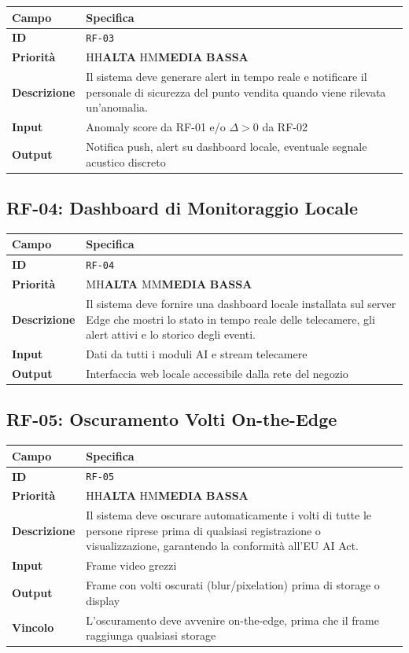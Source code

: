 \documentclass[a4paper, 12pt]{article}
\newcommand{\reqid}[1]{\texttt{\textcolor{visaiblue}{#1}}}
\newcommand{\priority}[1]{%
    \ifx#1H\textcolor{visaired}{\textbf{ALTA}}%
    \else\ifx#1M\textcolor{visaiorange}{\textbf{MEDIA}}%
    \else\textcolor{visaigreen}{\textbf{BASSA}}%
    \fi\fi
}
\begin{document}
\begin{tabularx}{\textwidth}{lL}
    \toprule
    \textbf{Campo} & \textbf{Specifica} \\
    \midrule
    \textbf{ID} & \reqid{RF-03} \\
    \textbf{Priorità} & \priority{H} \\
    \textbf{Descrizione} & Il sistema deve generare alert in tempo reale e notificare il personale di sicurezza del punto vendita quando viene rilevata un'anomalia. \\
    \textbf{Input} & Anomaly score da RF-01 e/o $\Delta > 0$ da RF-02 \\
    \textbf{Output} & Notifica push, alert su dashboard locale, eventuale segnale acustico discreto \\
    \bottomrule
\end{tabularx}

\subsection{RF-04: Dashboard di Monitoraggio Locale}

\begin{tabularx}{\textwidth}{lL}
    \toprule
    \textbf{Campo} & \textbf{Specifica} \\
    \midrule
    \textbf{ID} & \reqid{RF-04} \\
    \textbf{Priorità} & \priority{M} \\
    \textbf{Descrizione} & Il sistema deve fornire una dashboard locale installata sul server Edge che mostri lo stato in tempo reale delle telecamere, gli alert attivi e lo storico degli eventi. \\
    \textbf{Input} & Dati da tutti i moduli AI e stream telecamere \\
    \textbf{Output} & Interfaccia web locale accessibile dalla rete del negozio \\
    \bottomrule
\end{tabularx}

\subsection{RF-05: Oscuramento Volti On-the-Edge}

\begin{tabularx}{\textwidth}{lL}
    \toprule
    \textbf{Campo} & \textbf{Specifica} \\
    \midrule
    \textbf{ID} & \reqid{RF-05} \\
    \textbf{Priorità} & \priority{H} \\
    \textbf{Descrizione} & Il sistema deve oscurare automaticamente i volti di tutte le persone riprese prima di qualsiasi registrazione o visualizzazione, garantendo la conformità all'EU AI Act. \\
    \textbf{Input} & Frame video grezzi \\
    \textbf{Output} & Frame con volti oscurati (blur/pixelation) prima di storage o display \\
    \textbf{Vincolo} & L'oscuramento deve avvenire on-the-edge, prima che il frame raggiunga qualsiasi storage \\
    \bottomrule
\end{tabularx}
\end{document}

